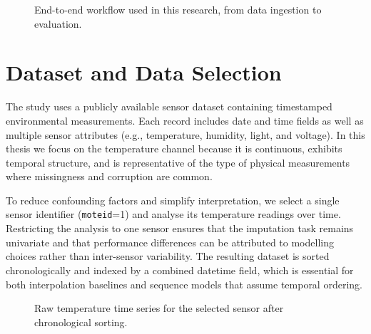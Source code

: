 \begin{figure}[ht]
	\centering
	\caption{End-to-end workflow used in this research, from data ingestion to evaluation.}
	\label{fig:method-pipeline}
\end{figure}

\section{Dataset and Data Selection}
The study uses a publicly available sensor dataset containing timestamped environmental measurements. Each record includes date and time fields as well as multiple sensor attributes (e.g., temperature, humidity, light, and voltage). In this thesis we focus on the temperature channel because it is continuous, exhibits temporal structure, and is representative of the type of physical measurements where missingness and corruption are common.

To reduce confounding factors and simplify interpretation, we select a single sensor identifier (\texttt{moteid}=1) and analyse its temperature readings over time. Restricting the analysis to one sensor ensures that the imputation task remains univariate and that performance differences can be attributed to modelling choices rather than inter-sensor variability. The resulting dataset is sorted chronologically and indexed by a combined datetime field, which is essential for both interpolation baselines and sequence models that assume temporal ordering.

\begin{figure}[ht]
	\centering
	\caption{Raw temperature time series for the selected sensor after chronological sorting.}
	\label{fig:raw-timeseries}
\end{figure}

